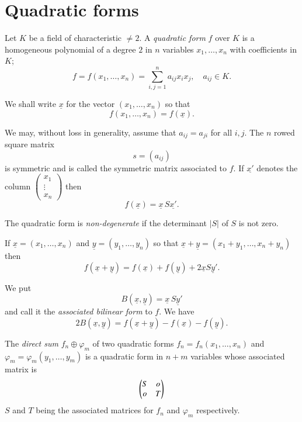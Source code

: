 \section{Quadratic forms}\label{s1}



Let $K$ be a field of characteristic $\neq 2$. A \textit{quadratic
  form} $f$ over $K$ is a homogeneous polynomial of a degree $2$ in
$n$ variables $x_1,\ldots,x_n$ with coefficients in $K$;
$$
f=f(x_1,\ldots,x_n)=\sum\limits_{i, j=1}^{n}
a_{ij}x_ix_j,\quad a_{ij}\in K.
$$

We shall write $\underline{x}$ for the vector $(x_1,\ldots,x_n)$ so that 
$$
f(x_1,\ldots,x_n)=f(\underline{x}).
$$

We may, without loss in generality, assume that $a_{ij}=a_{ji}$ for
all $i,j$. The $n$ rowed square matrix
$$
s=(a_{ij})
$$
is symmetric and is called the symmetric matrix associated to $f$. If
$\underline{x'}$ denotes the column $\begin{pmatrix}x_1\\\vdots\\x_n\end{pmatrix}$
  then
$$
f(\underline{x})=\underline{x}\, S \underline{x'}.
$$

The quadratic form is \textit{non-degenerate} if the determinant $|S|$
of $S$ is not zero.

If $\underline{x}= (x_1,\ldots,x_n)$ and
$\underline{y}=(y_1,\ldots,y_n)$ so that
$\underline{x}+\underline{y}=(x_1+y_1,\ldots, x_n+y_n)$ then
$$
f(\underline{x}+\underline{y})=f(\underline{x})+f(\underline{y})+2\underline{x}
S \underline{y}'.
$$

We put
$$
B(\underline{x},\underline{y})= \underline{x}\, S \underline{y}'
$$
and call it the \textit{associated bilinear form} to $f$. We have
\begin{equation}\label{eqn1}
2B(\underline{x},\underline{y})=f(\underline{x}+\underline{y})-f(\underline{x})-f(\underline{y}).
\end{equation}

The \textit{direct sum} $f_n \oplus \varphi_m$ of two quadratic
forms $f_n = f_n(x_1,\ldots, x_n)$ and
$\varphi_m=\varphi_m(y_1,\ldots,y_m)$ is a quadratic form in $n+m$
variables whose associated matrix is 
\begin{equation*}
\begin{pmatrix}
S & o\\
o & T
\end{pmatrix}
\end{equation*}
$S$ and $T$ being the associated matrices for $f_n$ and $\varphi_m$
respectively.

